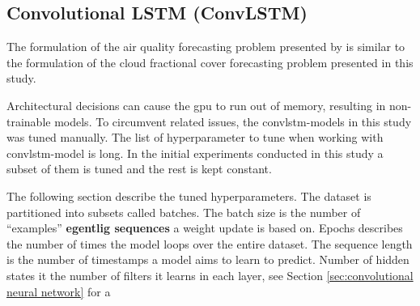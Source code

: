 \begin{table}[hp]
    \centering
    \caption{Update the statistics of the best AR-model.}
    \label{tab:weights_best_model}
\end{table}

\subsection{Convolutional LSTM (ConvLSTM)}
The formulation of the air quality forecasting problem presented by \citeauthor{SunAirLSTM} is similar to the formulation of the cloud fractional cover forecasting problem presented in this study. 

Architectural decisions %
can cause the \acrshort{gpu} to run out of memory, resulting in non-trainable models.
To circumvent related issues, the \acrshort{convlstm}-models in this study was tuned manually. The list of hyperparameter to tune when working with \acrshort{convlstm}-model is long. In the initial experiments conducted in this study a subset of them is tuned and the rest is kept constant.

The following section describe the tuned hyperparameters. The dataset is partitioned into subsets called batches. The batch size is the number of ``examples'' \textbf{egentlig sequences} a weight update is based on. Epochs describes the number of times the model loops over the entire dataset. The sequence length is the number of timestamps a model aims to learn to predict. Number of hidden states it the number of filters it learns in each layer, see Section \ref{sec:convolutional neural network} for a 


